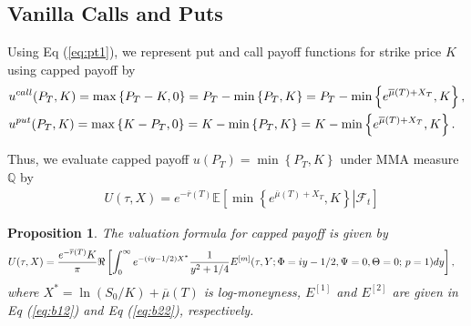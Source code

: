 \documentclass[pdftex,11pt,a4paper] {article}
\newtheorem{proposition}{Proposition}[section]
\begin{document}
\subsection{Vanilla Calls and Puts}

Using Eq (\ref{eq:pt1}), we represent put and call payoff functions for strike price $K$ using capped payoff by
\begin{equation} \label {eq:v1}
\begin{split}
  & u^{call}(P_{T},K) = \max\left\{P_{T}-K, 0\right\}=P_{T}- \min\left\{P_{T}, K\right\}=P_{T}-\min\left\{e^{\overline{\mu}(T)+X_{T}},K\right\},\\
	& u^{put}(P_{T},K) = \max\left\{K-P_{T}, 0\right\}=K - \min\left\{P_{T}, K\right\} = K - \min\left\{e^{\overline{\mu}(T)+X_{T}},K\right\}.\vspace*{-1.0\baselineskip}
\end{split} 
\end{equation}

Thus, we evaluate capped payoff $u(P_{T})=\min\left\{P_{T}, K\right\}$ under MMA measure $\mathbb{Q}$ by
\begin{equation} \label {eq:v2}
\begin{split}
  & U(\tau, X) = e^{-\overline{r}(T)}\mathbb{E}\left[\left. \min\left\{e^{\overline{\mu}(T)+X_{T}},K\right\}\right|\mathcal{F}_{t}\right]
\end{split} 
\end{equation}

\begin{proposition}\label{sc:capped}
The valuation formula for capped payoff is given by
\begin{equation} \label {eq:v8}
\begin{split}
  U(\tau, X)&  = \frac{e^{-\overline{r}(T)} K}{\pi} \Re\left[\int^{\infty}_{0} e^{-(iy-1/2) X^{*}}  \frac{1}{y^{2}+1/4} E^{[m]}(\tau,Y; \Phi=iy-1/2,\Psi=0,\Theta=0;\,p=1)dy\right],\vspace*{-1\baselineskip}
\end{split} 
\end{equation}
where $X^{*}=\ln(S_{0}/K)+\overline{\mu}(T)$ is log-moneyness, $E^{[1]}$ and $E^{[2]}$ are given in Eq (\ref{eq:b12}) and Eq (\ref{eq:b22}), respectively.
\end{proposition}
\end{document}
